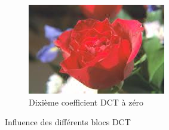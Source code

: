 \begin{figure}[H]
\begin{subfigure}[b]{0.3\textwidth}
        \includegraphics[width=\textwidth]{img/tot10.jpg}
        \caption{Dixième coefficient DCT à zéro}
        \label{img:7}
    \end{subfigure}
    \caption{Influence des différents blocs DCT}\label{fig:DCT}
\end{figure}
